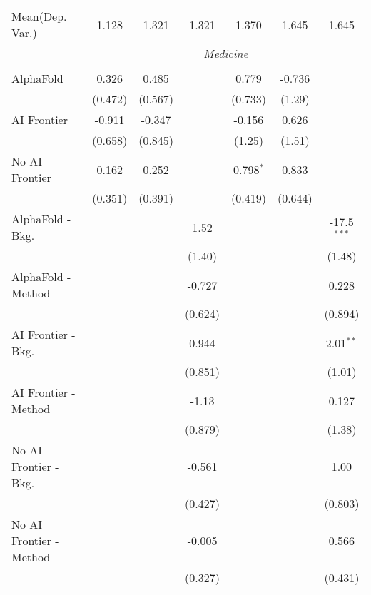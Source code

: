 \begin{tabular}{lcccccc}
Mean(Dep. Var.) & 1.128 & 1.321 & 1.321 & 1.370 & 1.645 & 1.645 \\
 & \multicolumn{6}{c}{\textit{Medicine}} \\ \\
   AlphaFold               & 0.326   & 0.485   &         & 0.779       & -0.736  &   \\   
                           & (0.472) & (0.567) &         & (0.733)     & (1.29)  &   \\   
   AI Frontier             & -0.911  & -0.347  &         & -0.156      & 0.626   &   \\   
                           & (0.658) & (0.845) &         & (1.25)      & (1.51)  &   \\   
   No AI Frontier          & 0.162   & 0.252   &         & 0.798$^{*}$ & 0.833   &   \\   
                           & (0.351) & (0.391) &         & (0.419)     & (0.644) &   \\   
   AlphaFold - Bkg.        &         &         & 1.52    &             &         & -17.5$^{***}$\\   
                           &         &         & (1.40)  &             &         & (1.48)\\   
   AlphaFold - Method      &         &         & -0.727  &             &         & 0.228\\   
                           &         &         & (0.624) &             &         & (0.894)\\   
   AI Frontier - Bkg.      &         &         & 0.944   &             &         & 2.01$^{**}$\\   
                           &         &         & (0.851) &             &         & (1.01)\\   
   AI Frontier - Method    &         &         & -1.13   &             &         & 0.127\\   
                           &         &         & (0.879) &             &         & (1.38)\\   
   No AI Frontier - Bkg.   &         &         & -0.561  &             &         & 1.00\\   
                           &         &         & (0.427) &             &         & (0.803)\\   
   No AI Frontier - Method &         &         & -0.005  &             &         & 0.566\\   
                           &         &         & (0.327) &             &         & (0.431)\\   

\end{tabular}
